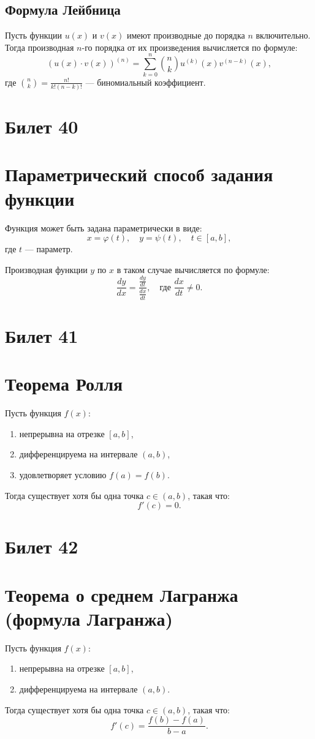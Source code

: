 \documentclass{article}
\begin{document}
\subsection*{Формула Лейбница}
Пусть функции \( u(x) \) и \( v(x) \) имеют производные до порядка \( n \) включительно. Тогда производная \( n \)-го порядка от их произведения вычисляется по формуле:
\[
(u(x) \cdot v(x))^{(n)} = \sum_{k=0}^n \binom{n}{k} u^{(k)}(x) v^{(n-k)}(x),
\]
где \( \binom{n}{k} = \frac{n!}{k! (n-k)!} \) — биномиальный коэффициент.


\section{Билет 40}

\section*{Параметрический способ задания функции}
Функция может быть задана параметрически в виде:
\[
x = \varphi(t), \quad y = \psi(t), \quad t \in [a, b],
\]
где \( t \) — параметр. 

Производная функции \( y \) по \( x \) в таком случае вычисляется по формуле:
\[
\frac{dy}{dx} = \frac{\frac{dy}{dt}}{\frac{dx}{dt}}, \quad \text{где } \frac{dx}{dt} \neq 0.
\]

\section{Билет 41}

\section*{Теорема Ролля}
Пусть функция \( f(x) \):
\begin{enumerate}
    \item непрерывна на отрезке \( [a, b] \),
    \item дифференцируема на интервале \( (a, b) \),
    \item удовлетворяет условию \( f(a) = f(b) \).
\end{enumerate}
Тогда существует хотя бы одна точка \( c \in (a, b) \), такая что:
\[
f'(c) = 0.
\]

\section{Билет 42}

\section*{Теорема о среднем Лагранжа (формула Лагранжа)}
Пусть функция \( f(x) \):
\begin{enumerate}
    \item непрерывна на отрезке \( [a, b] \),
    \item дифференцируема на интервале \( (a, b) \).
\end{enumerate}
Тогда существует хотя бы одна точка \( c \in (a, b) \), такая что:
\[
f'(c) = \frac{f(b) - f(a)}{b - a}.
\]
\end{document}

